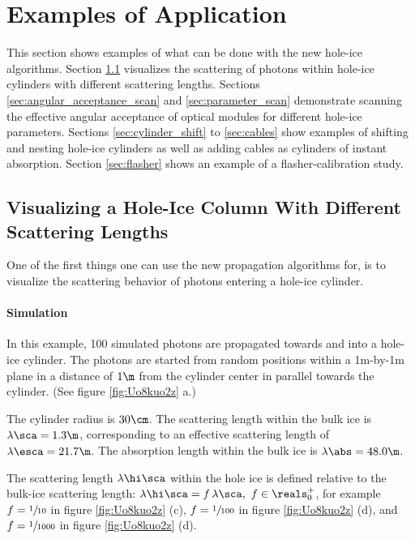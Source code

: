 
\section{Examples of Application}
\label{sec:applications}

This section shows examples of what can be done with the new hole-ice algorithms. Section \ref{sec:scattering_simulation} visualizes the scattering of photons within hole-ice cylinders with different scattering lengths. Sections \ref{sec:angular_acceptance_scan} and \ref{sec:parameter_scan} demonstrate scanning the effective angular acceptance of optical modules for different hole-ice parameters. Sections \ref{sec:cylinder_shift} to \ref{sec:cables} show examples of shifting and nesting hole-ice cylinders as well as adding cables as cylinders of instant absorption. Section \ref{sec:flasher} shows an example of a flasher-calibration study.


\subsection{Visualizing a Hole-Ice Column With Different Scattering Lengths}
\label{sec:scattering_simulation}

One of the first things one can use the new propagation algorithms for, is to visualize the scattering behavior of photons entering a hole-ice cylinder.

\paragraph{Simulation}
In this example, 100 simulated photons are propagated towards and into a hole-ice cylinder. The photons are started from random positions within a 1m-by-1m plane in a distance of $1\m$ from the cylinder center in parallel towards the cylinder. (See figure \ref{fig:Uo8kuo2z} a.)

The cylinder radius is $30\cm$. The scattering length within the bulk ice is $\lambda\sca = 1.3\m$, corresponding to an effective scattering length of $\lambda\esca = 21.7\m$. The absorption length within the bulk ice is $\lambda\abs = 48.0\m$.

The scattering length $\lambda\hi\sca$ within the hole ice is defined relative to the bulk-ice scattering length: $\lambda\hi\sca = f\,\lambda\sca, \ f \in \reals_0^+$, for example $f = \sfrac{1}{10}$ in figure \ref{fig:Uo8kuo2z} (c), $f = \sfrac{1}{100}$ in figure \ref{fig:Uo8kuo2z} (d), and $f = \sfrac{1}{1000}$ in figure \ref{fig:Uo8kuo2z} (d).

